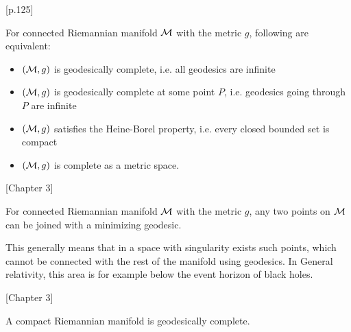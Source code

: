 \begin{thm}\citep{petersen}[p.125]
    \label{thm:hopf-Rinow}


    For connected Riemannian manifold $\mathcal{M}$ with the metric $g$, following are equivalent:
    \begin{itemize}
        \item $(\mathcal{M},g)$ is geodesically complete, i.e. all geodesics are infinite
        \item $(\mathcal{M},g)$ is geodesically complete at some point $P$, i.e. geodesics going through $P$ are infinite
        \item $(\mathcal{M},g)$ satisfies the Heine-Borel property, i.e. every closed bounded set is compact
        \item $(\mathcal{M},g)$ is complete as a metric space.
    \end{itemize}
\end{thm}
\begin{thm}\citep{claudio}[Chapter 3]
    \label{thm:hopf-Rinow_modified}

    For connected Riemannian manifold $\mathcal{M}$ with the metric $g$, any two points on $\mathcal{M}$ can be joined with a minimizing geodesic.
\end{thm}
This generally means that in a space with singularity exists such points, which cannot be connected with the rest of the manifold using geodesics. In General relativity, this area is for example below the event horizon of black holes.

\begin{thm}\citep{claudio}[Chapter 3]
    \label{thm:compact}

    A compact Riemannian manifold is geodesically complete.
\end{thm}





